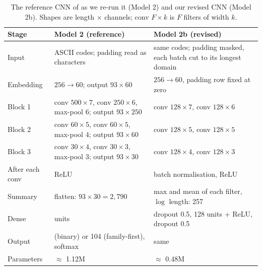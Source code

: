 \documentclass[11pt]{article}
\begin{document}
\begin{table}[t]
\centering
\small
\caption{The reference CNN of \citet{gregorio2024incremental} as we re-run it
(Model 2) and our revised CNN (Model 2b). Shapes are length $\times$ channels;
conv $F{\times}k$ is $F$ filters of width $k$.}
\label{tab:arch}
\begin{tabularx}{\linewidth}{@{}l>{\raggedright\arraybackslash}X>{\raggedright\arraybackslash}X@{}}
\toprule
Stage & Model 2 (reference) & Model 2b (revised) \\
\midrule
Input & 93 ASCII codes; padding read as characters & same codes; padding masked, each batch cut to its longest domain \\
Embedding & $256 \to 60$; output $93 \times 60$ & $256 \to 60$, padding row fixed at zero \\
Block 1 & conv $500{\times}7$, conv $250{\times}6$, max-pool 6; output $93 \times 250$ & conv $128{\times}7$, conv $128{\times}6$ \\
Block 2 & conv $60{\times}5$, conv $60{\times}5$, max-pool 4; output $93 \times 60$ & conv $128{\times}5$, conv $128{\times}5$ \\
Block 3 & conv $30{\times}4$, conv $30{\times}3$, max-pool 3; output $93 \times 30$ & conv $128{\times}4$, conv $128{\times}3$ \\
After each conv & ReLU & batch normalisation, ReLU \\
Summary & flatten: $93 \times 30 = 2{,}790$ & max and mean of each filter, $\log$ length: 257 \\
Dense & 15 units & dropout 0.5, 128 units + ReLU, dropout 0.5 \\
Output & 2 (binary) or 104 (family-first), softmax & same \\
Parameters & $\approx$ 1.12M & $\approx$ 0.48M \\
\bottomrule
\end{tabularx}
\end{table}
\end{document}
